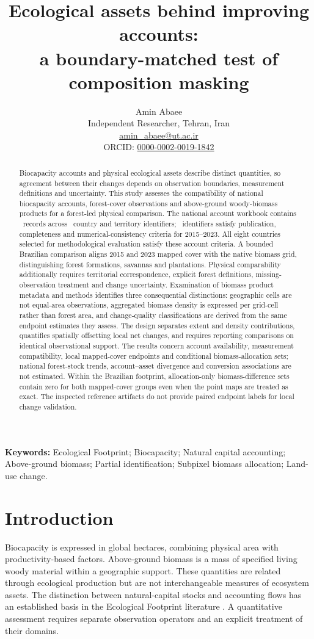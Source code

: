 \documentclass[11pt,a4paper]{article}
\title{Ecological assets behind improving accounts:\\a boundary-matched test of composition masking}
\author{Amin Abaee\\\small Independent Researcher, Tehran, Iran\\\small\href{mailto:amin_abaee@ut.ac.ir}{amin\_abaee@ut.ac.ir}\\\small ORCID: \href{https://orcid.org/0000-0002-0019-1842}{0000-0002-0019-1842}}
\date{}
\begin{document}
\maketitle
\begin{abstract}
Biocapacity accounts and physical ecological assets describe distinct quantities, so agreement between their changes depends on observation boundaries, measurement definitions and uncertainty. This study assesses the compatibility of national biocapacity accounts, forest-cover observations and above-ground woody-biomass products for a forest-led physical comparison. The national account workbook contains \NationalRows\ records across \CountryIDs\ country and territory identifiers; \AccountPass\ identifiers satisfy publication, completeness and numerical-consistency criteria for 2015--2023. All eight countries selected for methodological evaluation satisfy these account criteria. A bounded Brazilian comparison aligns 2015 and 2023 mapped cover with the native biomass grid, distinguishing forest formations, savannas and plantations. Physical comparability additionally requires territorial correspondence, explicit forest definitions, missing-observation treatment and change uncertainty. Examination of biomass product metadata and methods identifies three consequential distinctions: geographic cells are not equal-area observations, aggregated biomass density is expressed per grid-cell rather than forest area, and change-quality classifications are derived from the same endpoint estimates they assess. The design separates extent and density contributions, quantifies spatially offsetting local net changes, and requires reporting comparisons on identical observational support. The results concern account availability, measurement compatibility, local mapped-cover endpoints and conditional biomass-allocation sets; national forest-stock trends, account--asset divergence and conversion associations are not estimated. Within the Brazilian footprint, allocation-only biomass-difference sets contain zero for both mapped-cover groups even when the point maps are treated as exact. The inspected reference artifacts do not provide paired endpoint labels for local change validation.
\end{abstract}

\noindent\textbf{Keywords:} Ecological Footprint; Biocapacity; Natural capital accounting; Above-ground biomass; Partial identification; Subpixel biomass allocation; Land-use change.


\section{Introduction}
Biocapacity is expressed in global hectares, combining physical area with productivity-based factors. Above-ground biomass is a mass of specified living woody material within a geographic support. These quantities are related through ecological production but are not interchangeable measures of ecosystem assets. The distinction between natural-capital stocks and accounting flows has an established basis in the Ecological Footprint literature \citep{Mancini2017}. A quantitative assessment requires separate observation operators and an explicit treatment of their domains.
\end{document}
